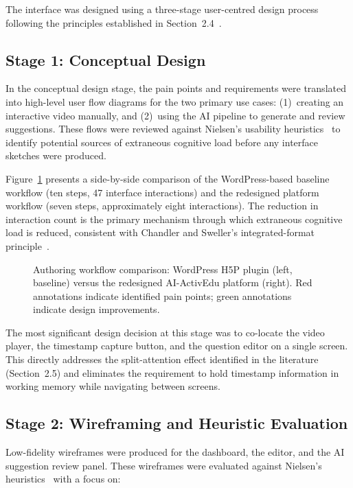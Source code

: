 The interface was designed using a three-stage user-centred design process
following the principles established in Section~2.4~\cite{garrett2010,
norman1988,nielsen1994}.

\subsection{Stage 1: Conceptual Design}

In the conceptual design stage, the pain points and requirements were
translated into high-level user flow diagrams for the two primary use cases:
(1)~creating an interactive video manually, and (2)~using the AI pipeline
to generate and review suggestions. These flows were reviewed against
Nielsen's usability heuristics~\cite{nielsen1994} to identify potential
sources of extraneous cognitive load before any interface sketches were
produced.

Figure~\ref{fig:workflow} presents a side-by-side comparison of the
WordPress-based baseline workflow (ten steps, 47 interface interactions) and
the redesigned platform workflow (seven steps, approximately eight interactions).
The reduction in interaction count is the primary mechanism through which
extraneous cognitive load is reduced, consistent with Chandler and Sweller's
integrated-format principle~\cite{chandler1991}.

\begin{figure}[H]
  \centering
  \resizebox{\linewidth}{!}{}
  \caption{Authoring workflow comparison: WordPress H5P plugin (left,
           baseline) versus the redesigned AI-ActivEdu platform (right).
           Red annotations indicate identified pain points; green annotations
           indicate design improvements.}
  \label{fig:workflow}
\end{figure}

The most significant design decision at this stage was to co-locate the video
player, the timestamp capture button, and the question editor on a single
screen. This directly addresses the split-attention effect identified in the
literature (Section~2.5) and eliminates the requirement to hold timestamp
information in working memory while navigating between screens.

\subsection{Stage 2: Wireframing and Heuristic Evaluation}

Low-fidelity wireframes were produced for the dashboard, the editor, and
the AI suggestion review panel. These wireframes were evaluated against
Nielsen's heuristics~\cite{nielsen1994} with a focus on:

